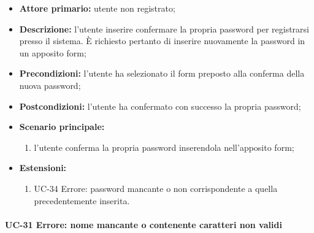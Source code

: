 	\begin{itemize}
		\item \textbf{Attore primario:} utente non registrato;
	
		\item \textbf{Descrizione:} l'utente inserire confermare la propria password per registrarsi presso il sistema. \`{E} richiesto pertanto di inserire nuovamente la password in un apposito form;

		\item \textbf{Precondizioni:} l'utente ha selezionato il form preposto alla conferma della nuova password;

		\item \textbf{Postcondizioni:} l'utente ha confermato con successo la propria password;

		\item \textbf{Scenario principale:}
			\begin{enumerate}
		  		\item l'utente conferma la propria password inserendola nell'apposito form;
	  		\end{enumerate}
		\item \textbf{Estensioni:}
	  		\begin{enumerate}
		  		\item UC-34 Errore: password mancante o non corrispondente a quella precedentemente inserita.
	  		\end{enumerate}
	\end{itemize}

\paragraph{UC-31 Errore: nome mancante o contenente caratteri non validi}

